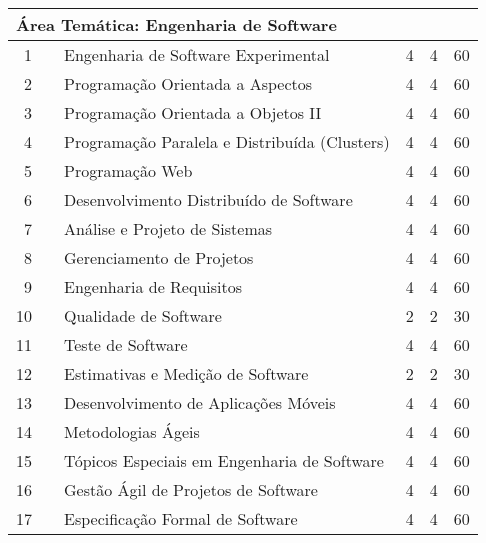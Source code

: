 \documentclass[
	12pt,				%
	openright,			%
  oneside,     %
	a4paper,			%
	english,			%
	french,				%
	spanish,			%
	brazil				%
	]{abntex2}
\begin{document}
\begin{apendicesenv}
\begin{longtable}{r|r|l|r|r|r}
\multicolumn{6}{l}{\textbf{Área Temática: Engenharia de Software}} \\ \hline
    1     &       & Engenharia de Software Experimental & 4     & 4     & 60 \\ \hline
    2     &       & Programação Orientada a Aspectos & 4     & 4     & 60 \\ \hline
    3     &       & Programação Orientada a Objetos II & 4     & 4     & 60 \\ \hline
    4     &       & Programação Paralela e Distribuída (Clusters) & 4     & 4     & 60 \\ \hline
    5     &       & Programação Web & 4   & 4  & 60 \\ \hline
    6     &       & Desenvolvimento Distribuído de Software & 4     & 4     & 60 \\ \hline
    7     &       & Análise e Projeto de Sistemas & 4     & 4     & 60 \\ \hline
    8     &       & Gerenciamento de Projetos & 4     & 4     & 60 \\ \hline
    9     &       & Engenharia de Requisitos & 4     & 4     & 60 \\ \hline
    10    &       & Qualidade de Software & 2     & 2     & 30 \\ \hline
    11    &       & Teste de Software & 4     & 4     & 60 \\ \hline
    12    &       & Estimativas e Medição de Software & 2     & 2     & 30 \\ \hline
    13    &       & Desenvolvimento de Aplicações Móveis & 4     & 4     & 60 \\ \hline
    14    &       & Metodologias Ágeis & 4     & 4     & 60 \\ \hline
    15    &       & \small{Tópicos Especiais em Engenharia de Software} & 4     & 4     & 60 \\ \hline
    16    &       & Gestão Ágil de Projetos de Software & 4     & 4     & 60 \\ \hline
    17    &       & Especificação Formal de Software & 4     & 4     & 60 \\ \hline


\end{longtable}
\end{apendicesenv}
\end{document}
